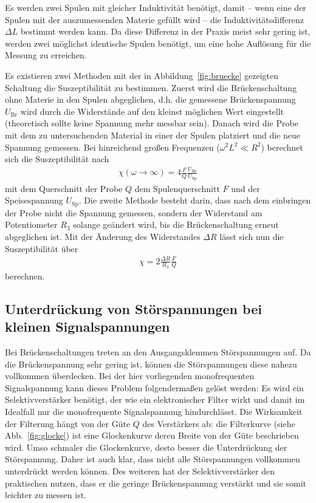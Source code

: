 Es werden zwei Spulen mit gleicher Induktivität benötigt, damit -- wenn eine der Spulen mit der auszumessenden Materie gefüllt wird -- die Induktivitätsdifferenz $\Delta L$ bestimmt werden kann. Da diese Differenz in der Praxis meist sehr gering ist, werden zwei möglichst identische Spulen benötigt, um eine hohe Auflösung für die Messung zu erreichen.

Es existieren zwei Methoden mit der in Abbildung~\ref{fig:bruecke} gezeigten Schaltung die Suszeptibilität zu bestimmen.
Zuerst wird die Brückenschaltung ohne Materie in den Spulen abgeglichen, d.h. die gemessene Brückenspannung $U_{\mathrm{Br}}$ wird durch die Widerstände auf den kleinst möglichen Wert eingestellt (theoretisch sollte keine Spannung mehr messbar sein).
Danach wird die Probe mit dem zu untersuchenden Material in einer der Spulen platziert und die neue Spannung gemessen. Bei hinreichend großen Frequenzen ($\omega^2 L^2 \ll R^2$) berechnet sich die Suszeptibilität nach
\begin{align}
  \label{equ:chi1}
  \chi(\omega \rightarrow \infty) = 4 \frac{F}{Q}\frac{U_{\mathrm{Br}}}{U_{\mathrm{Sp}}}
\end{align}
mit dem Querschnitt der Probe $Q$ dem Spulenquerschnitt $F$ und der Speisespannung $U_{\mathrm{Sp}}$.
Die zweite Methode besteht darin, dass nach dem einbringen der Probe nicht die Spannung gemessen, sondern der Widerstand am Potentiometer $R_3$ solange geändert wird, bis die Brückenschaltung erneut abgeglichen ist. Mit der Änderung des Widerstandes $\Delta R$ lässt sich nun die Suszeptibilität über
\begin{align}
  \label{equ:chi2}
  \chi = 2 \frac{\Delta R}{R_3}\frac{F}{Q}
\end{align}
berechnen.

\subsection{Unterdrückung von Störspannungen bei kleinen Signalspannungen}\label{sec:stoerung}
Bei Brückenschaltungen treten an den Ausgangsklemmen Störspannungen auf. Da die Brückenspannung sehr gering ist, können die Störspannungen diese nahezu vollkommen überdecken. Bei der hier vorliegenden monofrequenten Signalspannung kann dieses Problem folgendermaßen gelöst werden: Es wird ein Selektivverstärker benötigt, der wie ein elektronischer Filter wirkt und damit im Idealfall nur die monofrequente Signalspannung hindurchlässt. Die Wirksamkeit der Filterung hängt von der Güte $Q$ des Verstärkers ab: die Filterkurve (siehe Abb.~\ref{fig:glocke}) ist eine Glockenkurve deren Breite von der Güte beschrieben wird. Umso schmaler die Glockenkurve, desto besser die Unterdrückung der Störspannung. Daher ist auch klar, dass nicht alle Störspannungen vollkommen unterdrückt werden können. Des weiteren hat der Selektivverstärker den praktischen nutzen, dass er die geringe Brückenspannung verstärkt und sie somit leichter zu messen ist.

